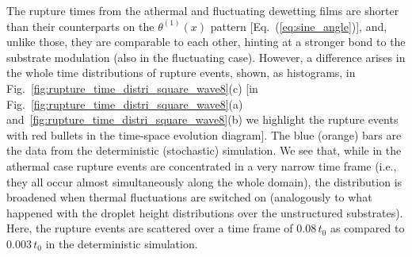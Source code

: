 The rupture times from the athermal and fluctuating dewetting films are shorter than their counterparts on the $\theta^{(1)}(x)$ pattern [Eq.~(\ref{eq:sine_angle})], and, unlike those, they are comparable to each other, hinting at a stronger bond to the substrate modulation (also in the fluctuating case).
However, a difference arises in the whole time distributions of rupture events, shown, as histograms, in Fig.~\ref{fig:rupture_time_distri_square_wave8}(c) [in Fig.~\ref{fig:rupture_time_distri_square_wave8}(a) and~\ref{fig:rupture_time_distri_square_wave8}(b) we highlight the rupture events with red bullets in the time-space evolution diagram].
The blue (orange) bars are the data from the deterministic (stochastic) simulation.
We see that, while in the athermal case rupture events are concentrated in a very narrow time frame (i.e., they all occur almost simultaneously along the whole domain), the distribution is broadened when thermal fluctuations are switched on (analogously to what happened with the droplet height distributions over the unstructured substrates).
Here, the rupture events are scattered over a time frame of $0.08\,t_0$ as compared to $0.003\,t_0$ in the deterministic simulation.

